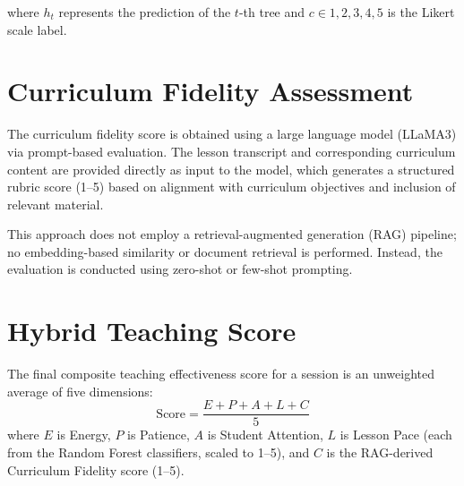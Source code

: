 where $h_t$ represents the prediction of the $t$-th tree and $c \in {1,2,3,4,5}$ is the Likert scale label.


\section*{Curriculum Fidelity Assessment}

The curriculum fidelity score is obtained using a large language model (LLaMA3) via prompt-based evaluation. The lesson transcript and corresponding curriculum content are provided directly as input to the model, which generates a structured rubric score (1--5) based on alignment with curriculum objectives and inclusion of relevant material.

This approach does not employ a retrieval-augmented generation (RAG) pipeline; no embedding-based similarity or document retrieval is performed. Instead, the evaluation is conducted using zero-shot or few-shot prompting.

\section*{Hybrid Teaching Score}

The final composite teaching effectiveness score for a session is an unweighted average of five dimensions:
\[
\text{Score} = \frac{E + P + A + L + C}{5}
\]
where $E$ is Energy, $P$ is Patience, $A$ is Student Attention, $L$ is Lesson Pace (each from the Random Forest classifiers, scaled to 1--5), and $C$ is the RAG-derived Curriculum Fidelity score (1--5).